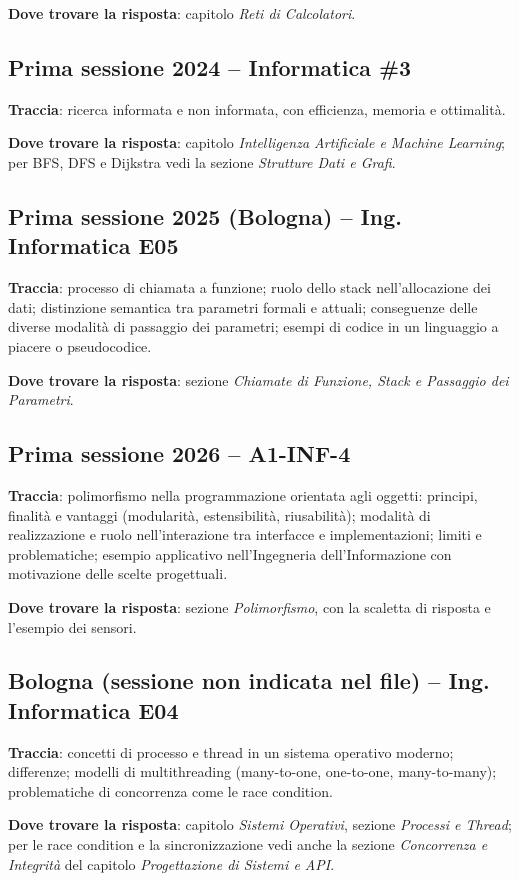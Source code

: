 \textbf{Dove trovare la risposta}: capitolo \emph{Reti di Calcolatori}.

\subsection*{Prima sessione 2024 -- Informatica \#3}
\textbf{Traccia}: ricerca informata e non informata, con efficienza, memoria e ottimalità.

\textbf{Dove trovare la risposta}: capitolo \emph{Intelligenza Artificiale e Machine Learning}; per BFS, DFS e Dijkstra vedi la sezione \emph{Strutture Dati e Grafi}.

\subsection*{Prima sessione 2025 (Bologna) -- Ing. Informatica E05}
\textbf{Traccia}: processo di chiamata a funzione; ruolo dello stack nell'allocazione dei dati; distinzione semantica tra parametri formali e attuali; conseguenze delle diverse modalità di passaggio dei parametri; esempi di codice in un linguaggio a piacere o pseudocodice.

\textbf{Dove trovare la risposta}: sezione \emph{Chiamate di Funzione, Stack e Passaggio dei Parametri}.

\subsection*{Prima sessione 2026 -- A1-INF-4}
\textbf{Traccia}: polimorfismo nella programmazione orientata agli oggetti: principi, finalità e vantaggi (modularità, estensibilità, riusabilità); modalità di realizzazione e ruolo nell'interazione tra interfacce e implementazioni; limiti e problematiche; esempio applicativo nell'Ingegneria dell'Informazione con motivazione delle scelte progettuali.

\textbf{Dove trovare la risposta}: sezione \emph{Polimorfismo}, con la scaletta di risposta e l'esempio dei sensori.

\subsection*{Bologna (sessione non indicata nel file) -- Ing. Informatica E04}
\textbf{Traccia}: concetti di processo e thread in un sistema operativo moderno; differenze; modelli di multithreading (many-to-one, one-to-one, many-to-many); problematiche di concorrenza come le race condition.

\textbf{Dove trovare la risposta}: capitolo \emph{Sistemi Operativi}, sezione \emph{Processi e Thread}; per le race condition e la sincronizzazione vedi anche la sezione \emph{Concorrenza e Integrità} del capitolo \emph{Progettazione di Sistemi e API}.
